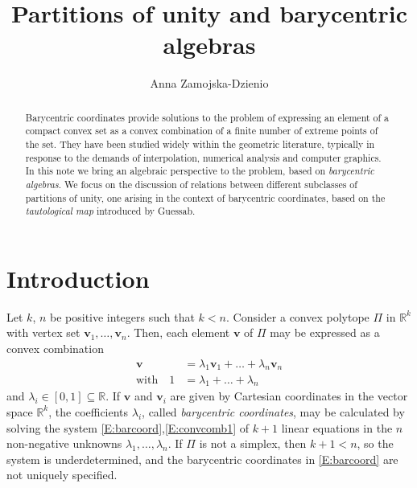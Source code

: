 \documentclass[12pt]{amsart}
\theoremstyle{plain}
\theoremstyle{definition}
\numberwithin{equation}{section}
\begin{document}
\title[Partitions of unity and barycentric algebras]{Partitions of unity and barycentric algebras}

\author[A. Zamojska-Dzienio]{Anna Zamojska-Dzienio}
\address{Faculty of Mathematics and Information Science\\
Warsaw University of Technology\\
00-661 Warsaw, Poland}



\begin{abstract}
Barycentric coordinates provide solutions to the problem of expressing an element of a compact convex set as a convex combination of a finite number of extreme points of the set. They have been studied widely within the geometric literature, typically in response to the demands of interpolation, numerical analysis and computer graphics. In this note we bring an algebraic perspective to the problem, based on \emph{barycentric algebras}. We focus on the discussion of relations between different subclasses of partitions of unity, one arising in the context of barycentric coordinates, based on the \emph{tautological map} introduced by Guessab.
\end{abstract}

\maketitle

\section{Introduction}
Let $k$, $n$ be positive integers such that $k< n$. Consider a convex polytope $\Pi$ in $\mathbb{R}^k$ with vertex set $\mathbf v_1,\dots,\mathbf v_n$. Then, each element $\mathbf v$ of $\Pi$ may be expressed as a convex combination
\begin{align}\label{E:barcoord}
\mathbf{v}&=\lambda_1\mathbf v_1+\ldots+\lambda_n\mathbf v_n
\\ \label{E:convcomb1}
\mbox{with}\quad
1&=\lambda_1+\ldots+\lambda_n
\end{align}
and $\lambda_i \in [0,1]\subseteq\mathbb{R}$. If $\mathbf v$ and $\mathbf v_i$ are given by Cartesian coordinates in the vector space $\mathbb{R}^k$, the coefficients $\lambda_i$, called \emph{barycentric coordinates}, may be calculated by solving the system \eqref{E:barcoord},\eqref{E:convcomb1} of $k+1$ linear equations in the $n$ non-negative unknowns $\lambda_1,\dots,\lambda_n$. If $\Pi$ is not a simplex, then $k+1<n$, so the system is underdetermined, and the barycentric coordinates in \eqref{E:barcoord} are not uniquely specified.
\end{document}
